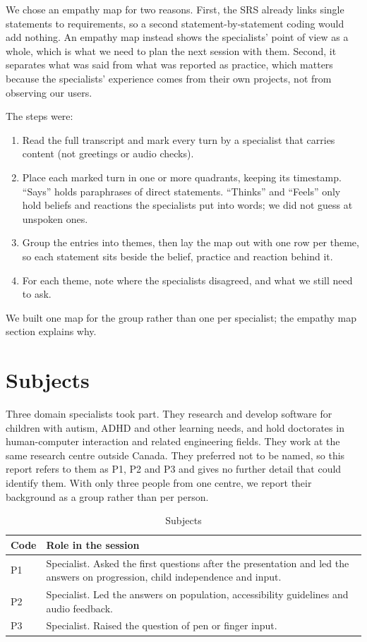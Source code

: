 \documentclass{article}
\begin{document}
We chose an empathy map for two reasons. First, the SRS already links single
statements to requirements, so a second statement-by-statement coding would
add nothing. An empathy map instead shows the specialists' point of view as a
whole, which is what we need to plan the next session with them. Second, it
separates what was said from what was reported as practice, which matters
because the specialists' experience comes from their own projects, not from
observing our users.

The steps were:
\begin{enumerate}
\item Read the full transcript and mark every turn by a specialist that
  carries content (not greetings or audio checks).
\item Place each marked turn in one or more quadrants, keeping its
  timestamp. ``Says'' holds paraphrases of direct statements. ``Thinks'' and
  ``Feels'' only hold beliefs and reactions the specialists put into words; we
  did not guess at unspoken ones.
\item Group the entries into themes, then lay the map out with one row per
  theme, so each statement sits beside the belief, practice and reaction
  behind it.
\item For each theme, note where the specialists disagreed, and what we still
  need to ask.
\end{enumerate}

We built one map for the group rather than one per specialist; the empathy
map section explains why.

\section{Subjects}
\label{sec:subjects}

Three domain specialists took part. They research and develop software for
children with autism, ADHD and other learning needs, and hold doctorates in
human-computer interaction and related engineering fields. They work at the
same research centre outside Canada. They preferred not to be named, so this
report refers to them as P1, P2 and P3 and gives no further detail that could
identify them. With only three people from one centre, we report their
background as a group rather than per person.

\begin{table}[h]
\centering
\begin{tabularx}{\textwidth}{lX}
\toprule
\textbf{Code} & \textbf{Role in the session} \\
\midrule
P1 & Specialist. Asked the first questions after the presentation and led the
answers on progression, child independence and input. \\
P2 & Specialist. Led the answers on population, accessibility guidelines and
audio feedback. \\
P3 & Specialist. Raised the question of pen or finger input. \\
\bottomrule
\end{tabularx}
\caption{Subjects}
\end{table}
\end{document}
